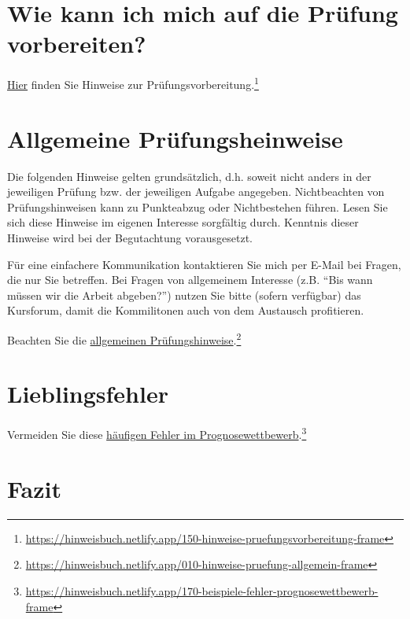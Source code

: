 \documentclass[
  a4paper,
  DIV=11]{scrreprt}
\theoremstyle{definition}
\theoremstyle{definition}
\theoremstyle{definition}
\theoremstyle{remark}
\begin{document}
\section{Wie kann ich mich auf die Prüfung
vorbereiten?}\label{wie-kann-ich-mich-auf-die-pruxfcfung-vorbereiten}

\href{https://hinweisbuch.netlify.app/150-hinweise-pruefungsvorbereitung-frame}{Hier}
finden Sie Hinweise zur Prüfungsvorbereitung.\footnote{\url{https://hinweisbuch.netlify.app/150-hinweise-pruefungsvorbereitung-frame}}

\section{Allgemeine
Prüfungsheinweise}\label{allgemeine-pruxfcfungsheinweise}

Die folgenden Hinweise gelten grundsätzlich, d.h. soweit nicht anders in
der jeweiligen Prüfung bzw. der jeweiligen Aufgabe angegeben.
Nichtbeachten von Prüfungshinweisen kann zu Punkteabzug oder
Nichtbestehen führen. Lesen Sie sich diese Hinweise im eigenen Interesse
sorgfältig durch. Kenntnis dieser Hinweise wird bei der Begutachtung
vorausgesetzt.

Für eine einfachere Kommunikation kontaktieren Sie mich per E-Mail bei
Fragen, die nur Sie betreffen. Bei Fragen von allgemeinem Interesse
(z.B. ``Bis wann müssen wir die Arbeit abgeben?'') nutzen Sie bitte
(sofern verfügbar) das Kursforum, damit die Kommilitonen auch von dem
Austausch profitieren.

Beachten Sie die
\href{https://hinweisbuch.netlify.app/010-hinweise-pruefung-allgemein-frame}{allgemeinen
Prüfungshinweise}.\footnote{\url{https://hinweisbuch.netlify.app/010-hinweise-pruefung-allgemein-frame}}

\section{Lieblingsfehler}\label{lieblingsfehler}

Vermeiden Sie diese
\href{https://hinweisbuch.netlify.app/170-beispiele-fehler-prognosewettbewerb-frame}{häufigen
Fehler im Prognosewettbewerb}.\footnote{\url{https://hinweisbuch.netlify.app/170-beispiele-fehler-prognosewettbewerb-frame}}

\section{Fazit}\label{fazit}
\end{document}
